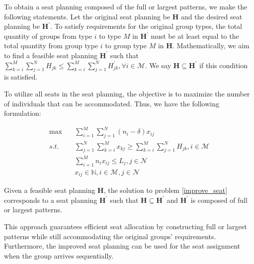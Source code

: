 To obtain a seat planning composed of the full or largest patterns, we make the following statements.
Let the original seat planning be $\bm{H}$ and the desired seat planning be $\bm{H}^{\prime}$. To satisfy requirements for the original group types, the total quantity of groups from type $i$ to type $M$ in $\bm{H}^{\prime}$ must be at least equal to the total quantity from group type $i$ to group type $M$ in $\bm{H}$. Mathematically, we aim to find a feasible seat planning $\bm{H}^{\prime}$ such that $\sum_{k=i}^{M} \sum_{j=1}^{N} H_{jk} \leq \sum_{k=i}^{M} \sum_{j=1}^{N} H^{'}_{jk}, \forall i \in \mathcal{M}$. We say $\bm{H} \subseteq \bm{H}^{'}$ if this condition is satisfied.

To utilize all seats in the seat planning, the objective is to maximize the number of individuals that can be accommodated. Thus, we have the following formulation:

\begin{equation}\label{improve_seat}
  \begin{aligned}
  \max \quad & \sum_{i=1}^{M} \sum_{j=1}^{N} (n_i-\delta)  x_{ij} \\
  s.t. \quad & \sum_{j=1}^{N} \sum_{k=i}^{M} x_{kj} \geq  \sum_{k=i}^{M} \sum_{j=1}^{N} H_{jk}, i \in \mathcal{M} \\
  & \sum_{i=1}^{M} n_{i} x_{ij} \leq L_{j}, j \in \mathcal{N} \\
  & x_{ij} \in \mathbb{N}, i \in \mathcal{M}, j \in \mathcal{N}
  \end{aligned}
\end{equation}

\begin{prop}\label{prop_construction}
Given a feasible seat planning $\bm{H}$, the solution to problem \eqref{improve_seat} corresponds to a seat planning $\bm{H}^{\prime}$ such that $\bm{H} \subseteq \bm{H}^{\prime}$ and $\bm{H}^{'}$ is composed of full or largest patterns.
\end{prop}


This approach guarantees efficient seat allocation by constructing full or largest patterns while still accommodating the original groups' requirements. Furthermore, the improved seat planning can be used for the seat assignment when the group arrives sequentially.


